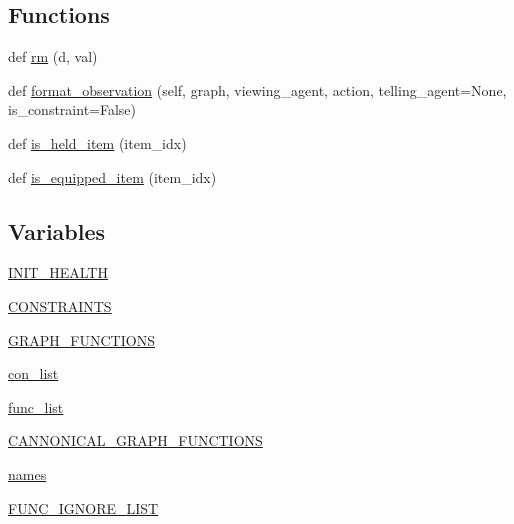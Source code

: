 \subsection*{Functions}
\begin{DoxyCompactItemize}
\item 
def \hyperlink{namespacelight__chats_1_1graph_a1e4fb75c70e6fbe0b134e3fe135deeba}{rm} (d, val)
\item 
def \hyperlink{namespacelight__chats_1_1graph_a6d359942394976812f0055affc289f56}{format\+\_\+observation} (self, graph, viewing\+\_\+agent, action, telling\+\_\+agent=None, is\+\_\+constraint=False)
\item 
def \hyperlink{namespacelight__chats_1_1graph_aa0be6ee7e9f549a7195bea9dfb962ad6}{is\+\_\+held\+\_\+item} (item\+\_\+idx)
\item 
def \hyperlink{namespacelight__chats_1_1graph_a76960b89046df1b0cda1de931fa1fd69}{is\+\_\+equipped\+\_\+item} (item\+\_\+idx)
\end{DoxyCompactItemize}
\subsection*{Variables}
\begin{DoxyCompactItemize}
\item 
\hyperlink{namespacelight__chats_1_1graph_a806f40d0c11473b9fe6d8c80658161f7}{I\+N\+I\+T\+\_\+\+H\+E\+A\+L\+TH}
\item 
\hyperlink{namespacelight__chats_1_1graph_a1604744a1f1ef821e7653b3265dc8fac}{C\+O\+N\+S\+T\+R\+A\+I\+N\+TS}
\item 
\hyperlink{namespacelight__chats_1_1graph_ad62f03f1aaa9ca44b858255d54b423ec}{G\+R\+A\+P\+H\+\_\+\+F\+U\+N\+C\+T\+I\+O\+NS}
\item 
\hyperlink{namespacelight__chats_1_1graph_aa5ff353e544cb691fd1d678638042a30}{con\+\_\+list}
\item 
\hyperlink{namespacelight__chats_1_1graph_ae1def74d4d0d0f7ffc23869f936af17f}{func\+\_\+list}
\item 
\hyperlink{namespacelight__chats_1_1graph_a7e5077a2835b09d1868590c141a4eb79}{C\+A\+N\+N\+O\+N\+I\+C\+A\+L\+\_\+\+G\+R\+A\+P\+H\+\_\+\+F\+U\+N\+C\+T\+I\+O\+NS}
\item 
\hyperlink{namespacelight__chats_1_1graph_ae2687376900f156c248dd3f8b8ee8b13}{names}
\item 
\hyperlink{namespacelight__chats_1_1graph_a6028d60ac8e408ffbdab63610a20ccdf}{F\+U\+N\+C\+\_\+\+I\+G\+N\+O\+R\+E\+\_\+\+L\+I\+ST}
\end{DoxyCompactItemize}


